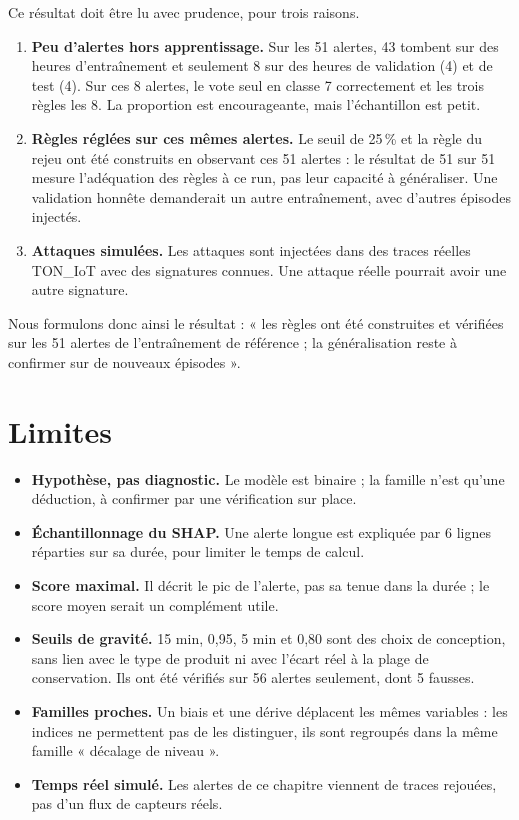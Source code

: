 Ce résultat doit être lu avec prudence, pour trois raisons.

\begin{enumerate}
  \item \textbf{Peu d'alertes hors apprentissage.} Sur les 51 alertes, 43
        tombent sur des heures d'entraînement et seulement 8 sur des heures de
        validation (4) et de test (4). Sur ces 8 alertes, le vote seul en
        classe 7 correctement et les trois règles les 8. La
        proportion est encourageante, mais l'échantillon est petit.
  \item \textbf{Règles réglées sur ces mêmes alertes.} Le seuil de 25\,\% et la
        règle du rejeu ont été construits en observant ces 51 alertes : le
        résultat de 51 sur 51 mesure l'adéquation des règles à ce run, pas leur
        capacité à généraliser. Une validation honnête demanderait un autre
        entraînement, avec d'autres épisodes injectés.
  \item \textbf{Attaques simulées.} Les attaques sont injectées dans des traces
        réelles TON\_IoT avec des signatures connues. Une attaque réelle
        pourrait avoir une autre signature.
\end{enumerate}

Nous formulons donc ainsi le résultat : « les règles ont été construites et
vérifiées sur les 51 alertes de l'entraînement de référence ; la généralisation
reste à confirmer sur de nouveaux épisodes ».


\section{Limites}
\label{sec:expl_limites}

\begin{itemize}
  \item \textbf{Hypothèse, pas diagnostic.} Le modèle est binaire ; la famille
        n'est qu'une déduction, à confirmer par une vérification sur place.
  \item \textbf{Échantillonnage du SHAP.} Une alerte longue est expliquée par 6
        lignes réparties sur sa durée, pour limiter le temps de calcul.
  \item \textbf{Score maximal.} Il décrit le pic de l'alerte, pas sa tenue
        dans la durée ; le score moyen serait un complément utile.
  \item \textbf{Seuils de gravité.} 15 min, 0,95, 5 min et 0,80 sont des choix de
        conception, sans lien avec le type de produit ni avec l'écart réel à la
        plage de conservation. Ils ont été vérifiés sur 56 alertes seulement,
        dont 5 fausses.
  \item \textbf{Familles proches.} Un biais et une dérive déplacent les mêmes
        variables : les indices ne permettent pas de les distinguer, ils sont
        regroupés dans la même famille « décalage de niveau ».
  \item \textbf{Temps réel simulé.} Les alertes de ce chapitre viennent de
        traces rejouées, pas d'un flux de capteurs réels.
\end{itemize}

